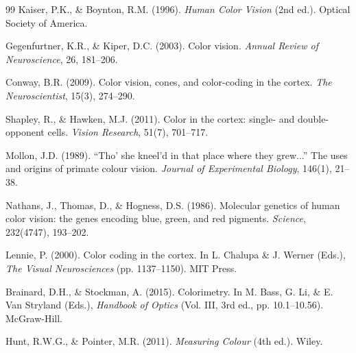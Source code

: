 \documentclass[11pt,a4paper]{article}
\begin{document}
\begin{thebibliography}{99}
Kaiser, P.K., \& Boynton, R.M. (1996). \textit{Human Color Vision} (2nd ed.). Optical Society of America.

Gegenfurtner, K.R., \& Kiper, D.C. (2003). Color vision. \textit{Annual Review of Neuroscience}, 26, 181--206.

Conway, B.R. (2009). Color vision, cones, and color-coding in the cortex. \textit{The Neuroscientist}, 15(3), 274--290.

Shapley, R., \& Hawken, M.J. (2011). Color in the cortex: single- and double-opponent cells. \textit{Vision Research}, 51(7), 701--717.

Mollon, J.D. (1989). ``Tho' she kneel'd in that place where they grew...'' The uses and origins of primate colour vision. \textit{Journal of Experimental Biology}, 146(1), 21--38.

Nathans, J., Thomas, D., \& Hogness, D.S. (1986). Molecular genetics of human color vision: the genes encoding blue, green, and red pigments. \textit{Science}, 232(4747), 193--202.

Lennie, P. (2000). Color coding in the cortex. In L. Chalupa \& J. Werner (Eds.), \textit{The Visual Neurosciences} (pp. 1137--1150). MIT Press.

Brainard, D.H., \& Stockman, A. (2015). Colorimetry. In M. Bass, G. Li, \& E. Van Stryland (Eds.), \textit{Handbook of Optics} (Vol. III, 3rd ed., pp. 10.1--10.56). McGraw-Hill.

Hunt, R.W.G., \& Pointer, M.R. (2011). \textit{Measuring Colour} (4th ed.). Wiley.

\end{thebibliography}
\end{document}

